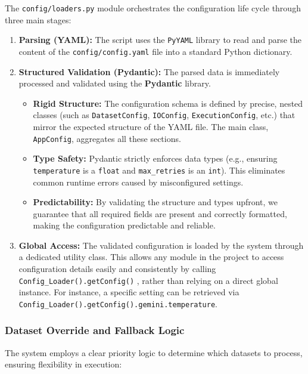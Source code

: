 \documentclass[12pt,a4paper]{article}
\begin{document}
The \texttt{config/loaders.py} module orchestrates the configuration life cycle through three main stages:

\begin{enumerate}
    \item \textbf{Parsing (YAML):} The script uses the \texttt{PyYAML} library to read and parse the content of the \texttt{config/config.yaml} file into a standard Python dictionary.
    
    \item \textbf{Structured Validation (Pydantic):} The parsed data is immediately processed and validated using the \textbf{Pydantic} library. 
    \begin{itemize}
        \item \textbf{Rigid Structure:} The configuration schema is defined by precise, nested classes (such as \texttt{DatasetConfig}, \texttt{IOConfig}, \texttt{ExecutionConfig}, etc.) that mirror the expected structure of the YAML file. The main class, \texttt{AppConfig}, aggregates all these sections.
        \item \textbf{Type Safety:} Pydantic strictly enforces data types (e.g., ensuring \texttt{temperature} is a \texttt{float} and \texttt{max\_retries} is an \texttt{int}). This eliminates common runtime errors caused by misconfigured settings.
        \item \textbf{Predictability:} By validating the structure and types upfront, we guarantee that all required fields are present and correctly formatted, making the configuration predictable and reliable.
    \end{itemize}
    
    \item \textbf{Global Access:} The validated configuration is loaded by the system through a dedicated utility class. This allows any module in the project to access configuration details easily and consistently by calling \texttt{Config\_Loader().getConfig()} , rather than relying on a direct global instance. For instance, a specific setting can be retrieved via \texttt{Config\_Loader().getConfig().gemini.temperature}.
\end{enumerate}

\subsubsection{Dataset Override and Fallback Logic}

The system employs a clear priority logic to determine which datasets to process, ensuring flexibility in execution:
\end{document}
